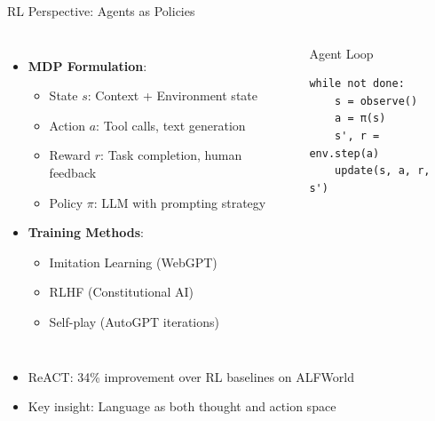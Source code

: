 \documentclass[aspectratio=169]{beamer}
\begin{document}
\begin{frame}{RL Perspective: Agents as Policies}
	\begin{columns}
		\begin{itemize}
			\item {\color{highlight}\textbf{MDP Formulation}}:
			\begin{itemize}
				\item State $s$: Context + Environment state
				\item Action $a$: Tool calls, text generation
				\item Reward $r$: Task completion, human feedback
				\item Policy $\pi$: LLM with prompting strategy
			\end{itemize}
			\item {\color{highlight}\textbf{Training Methods}}:
			\begin{itemize}
				\item Imitation Learning (WebGPT)
				\item RLHF (Constitutional AI)
				\item Self-play (AutoGPT iterations)
			\end{itemize}
		\end{itemize}
		
		\begin{block}{Agent Loop}
			\small
			\begin{verbatim}
while not done:
    s = observe()
    a = π(s)
    s', r = env.step(a)
    update(s, a, r, s')
\end{verbatim}
		\end{block}
	\end{columns}
	
	\vspace{0.3cm}
	\begin{itemize}
		\item ReACT: 34\% improvement over RL baselines on ALFWorld
		\item Key insight: Language as both thought and action space
	\end{itemize}
\end{frame}
\end{document}

